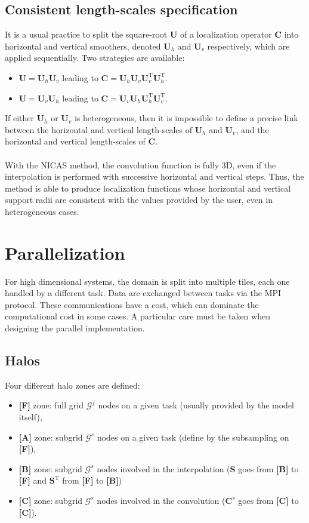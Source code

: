 \documentclass[12pt]{scrartcl}
\begin{document}
\subsection{Consistent length-scales specification}
It is a usual practice to split the square-root $\mathbf{U}$ of a localization operator $\mathbf{C}$ into horizontal and vertical smoothers, denoted $\mathbf{U}_h$ and $\mathbf{U}_v$ respectively, which are applied sequentially. Two strategies are available:
\begin{itemize}
\item $\mathbf{U} = \mathbf{U}_h \mathbf{U}_v$ leading to $\mathbf{C} = \mathbf{U}_h \mathbf{U}_v \mathbf{U}_v^\mathrm{T} \mathbf{U}_h^\mathrm{T}$.
\item $\mathbf{U} = \mathbf{U}_v \mathbf{U}_h$ leading to $\mathbf{C} = \mathbf{U}_v \mathbf{U}_h \mathbf{U}_h^\mathrm{T} \mathbf{U}_v^\mathrm{T}$.
\end{itemize}
If either $\mathbf{U}_h$ or $\mathbf{U}_v$ is heterogeneous, then it is impossible to define a precise link between the horizontal and vertical length-scales of $\mathbf{U}_h$ and $\mathbf{U}_v$, and the horizontal and vertical length-scales of $\mathbf{C}$.\\
$  $\\
With the NICAS method, the convolution function is fully 3D, even if the interpolation is performed with successive horizontal and vertical steps. Thus, the method is able to produce localization functions whose horizontal and vertical support radii are consistent with the values provided by the user, even in heterogeneous cases.

\section{Parallelization}
For high dimensional systems, the domain is split into multiple tiles, each one handled by a different task. Data are exchanged between tasks via the MPI protocol. These communications have a cost, which can dominate the computational cost in some cases. A particular care must be taken when designing the parallel implementation.

\subsection{Halos}
Four different halo zones are defined:
\begin{itemize}
\item \textbf{[F]} zone: full grid $\mathcal{G}^f$ nodes on a given task (usually provided by the model itself),
\item \textbf{[A]} zone: subgrid $\mathcal{G}^s$ nodes on a given task (define by the subsampling on \textbf{[F]}),
\item \textbf{[B]} zone: subgrid $\mathcal{G}^s$ nodes involved in the interpolation ($\mathbf{S}$ goes from \textbf{[B]} to \textbf{[F]} and $\mathbf{S}^\mathrm{T}$ from \textbf{[F]} to \textbf{[B]})
\item \textbf{[C]} zone: subgrid $\mathcal{G}^s$ nodes involved in the convolution ($\mathbf{C}^s$ goes from \textbf{[C]} to \textbf{[C]}).
\end{itemize}
\end{document}
